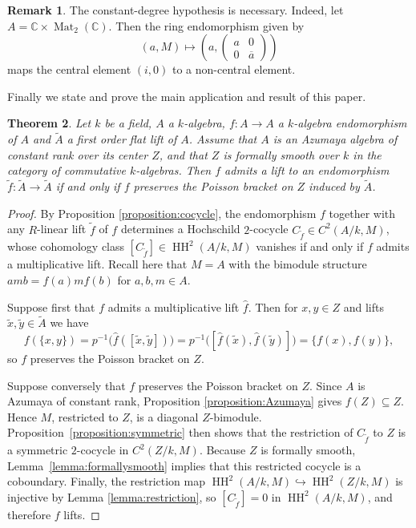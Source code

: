 \documentclass[a4paper,11pt,reqno]{amsart}%
\newtheorem{theorem}{Theorem}[section]
\theoremstyle{definition}
\newtheorem{remark}[theorem]{Remark}
\newcommand{\CC}{\mathbb{C}}
\newcommand{\HH}{\operatorname{HH}}
\newcommand{\Mat}{\operatorname{Mat}}
\newcommand{\<}{\<}
\renewcommand{\>}{\>}
\newcommand{\lA}{\widetilde{A}}
\newcommand{\lf}{\widetilde{f}}
\numberwithin{equation}{subsection}
\begin{document}
\begin{remark}
The constant-degree hypothesis is necessary. Indeed, let $A = \CC\times \Mat_2(\CC)$. Then the ring endomorphism 
given by 
$$
(a, M) \mapsto \left(a, \begin{pmatrix} a & 0 \\ 0 & \overline{a} \end{pmatrix}\right)
$$
maps the central element $(i, 0)$ to a non-central element.
\end{remark}

Finally we state and prove the main application and result of this paper.

\begin{theorem}\label{theorem:main}
Let $k$ be a field, $A$ a $k$-algebra, $f: A \rightarrow A$ a $k$-algebra endomorphism of $A$ and $\lA$ a first order flat lift of $A$. 
Assume that $A$ is an Azumaya algebra of constant rank over its center $Z$, and that $Z$ is formally smooth over $k$ in the category of commutative $k$-algebras. Then $f$ admits a lift to an endomorphism $\lf: \lA\rightarrow \lA$ if and only
if $f$ preserves the Poisson bracket on $Z$ induced by $\lA$.
\end{theorem}
\begin{proof}
By Proposition \ref{proposition:cocycle}, the endomorphism $f$ together with any $R$-linear lift 
$\lf$ of $f$ determines a Hochschild $2$-cocycle $C_{\lf} \in C^2(A/k, M)$, 
whose cohomology class $[C_{\lf}] \in \HH^2(A/k, M)$ vanishes if and only if 
$f$ admits a multiplicative lift. Recall here that $M = A$ with the 
bimodule structure $a m b = f(a) m f(b)$ for $a, b, m\in A$.

Suppose first that $f$ admits a multiplicative lift $\widehat{f}$. Then for $x,y\in Z$ and lifts $\tilde{x},\tilde{y}\in \lA$ we have
$$
f(\{x,y\}) = p^{-1}\bigl(\widehat{f}([\tilde{x},\tilde{y}])\bigr)
= p^{-1}\bigl([\widehat{f}(\tilde{x}),\widehat{f}(\tilde{y})]\bigr)
= \{f(x),f(y)\},
$$
so $f$ preserves the Poisson bracket on $Z$.

Suppose conversely that $f$ preserves the Poisson bracket on $Z$. Since $A$ is Azumaya of constant rank, Proposition \ref{proposition:Azumaya} gives $f(Z)\subseteq Z$.
Hence $M$, restricted to $Z$, is a diagonal $Z$-bimodule. Proposition~\ref{proposition:symmetric} then shows that the restriction of $C_{\lf}$ to $Z$ is a symmetric $2$-cocycle in $C^2(Z/k, M)$.
Because $Z$ is formally smooth, Lemma~\ref{lemma:formallysmooth} implies that this restricted cocycle is a coboundary.
Finally, the restriction map $\HH^2(A/k, M) \hookrightarrow \HH^2(Z/k, M)$ is injective by Lemma \ref{lemma:restriction}, so $[C_{\lf}] = 0$ in $\HH^2(A/k, M)$, and therefore $f$ lifts.
\end{proof}
\end{document}
